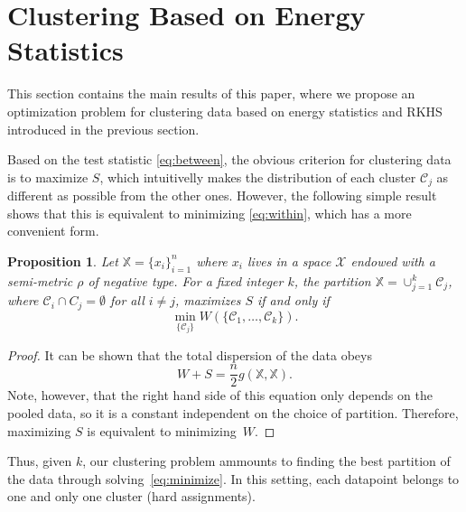 \documentclass{article}
\newtheorem{proposition}[theorem]{Proposition}
\newcommand\C{{\mathcal{C}}}
\begin{document}
\section{Clustering Based on Energy Statistics}
\label{sec:clustering_theory}

This section contains the main results of this paper, where 
we propose an optimization problem for clustering data
based on energy statistics and RKHS introduced in the previous section.

Based on the test statistic \eqref{eq:between}, the obvious
criterion for clustering data is to 
maximize $S$, which intuitivelly makes the distribution of each
cluster $\C_j$ as different
as possible from the other ones. However, the following 
simple result
shows that this is equivalent to minimizing
\eqref{eq:within}, which has a more convenient form.

\begin{proposition}
\label{th:minimize}
Let $\mathbb{X} = \{x_i\}_{i=1}^{n}$ where 
$x_i$ lives in a space $\mathcal{X}$ endowed with a semi-metric $\rho$ of
negative type. For a fixed integer $k$,
the partition
$\mathbb{X} = \cup_{j=1}^k \C_j$, where $\C_i \cap C_j = \emptyset$ for
all $i\ne j$, maximizes $S$ if and only if
\begin{equation}
\label{eq:minimize}
\min_{\{ \C_j \} } W(\{ 
\C_1, \dotsc, \C_k
\}).
\end{equation}
\end{proposition}
\begin{proof}
It can be shown that the total dispersion of the data obeys \cite{Szkely2013}
\begin{equation}
W + S = \dfrac{n}{2} g(\mathbb{X}, \mathbb{X}). 
\end{equation}
Note, however, that the right hand side of this equation 
only depends on the pooled data, so it is a constant
independent on the choice of partition. Therefore, maximizing
$S$ is equivalent to minimizing~$W$.
\end{proof}

Thus, given $k$, our clustering problem ammounts to
finding the best partition of the data through solving~\eqref{eq:minimize}.
In this setting, each datapoint belongs to one and only one cluster
(hard assignments).
\end{document}
